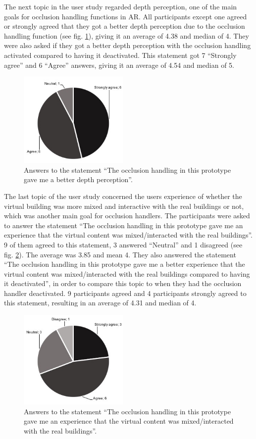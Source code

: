 The next topic in the user study regarded depth perception, one of the main goals for occlusion handling functions in AR. All participants except one agreed or strongly agreed that they got a better depth perception due to the occlusion handling function (see fig. \ref{fig:_image_user-depth}), giving it an average of 4.38 and median of 4. They were also asked if they got a better depth perception with the occlusion handling activated compared to having it deactivated. This statement got 7 ``Strongly agree'' and 6 ``Agree'' answers, giving it an average of 4.54 and median of 5.

\begin{figure}
\includegraphics[width=200px, height=174px]{_image_user-depth}
\caption{Answers to the statement ``The occlusion handling in this prototype gave me a better depth perception''.}
\label{fig:_image_user-depth}
\end{figure}

The last topic of the user study concerned the users experience of whether the virtual building was more mixed and interactive with the real buildings or not, which was another main goal for occlusion handlers. The participants were asked to answer the statement ``The occlusion handling in this prototype gave me an experience that the virtual content was mixed/interacted with the real buildings''. 9 of them agreed to this statement, 3 answered ``Neutral'' and 1 disagreed (see fig. \ref{fig:_image_user-mixed-interact}). The average was 3.85 and mean 4. They also answered the statement ``The occlusion handling in this prototype gave me a better experience that the virtual content was mixed/interacted with the real buildings compared to having it deactivated'', in order to compare this topic to when they had the occlusion handler deactivated. 9 participants agreed and 4 participants strongly agreed to this statement, resulting in an average of 4.31 and median of 4.

\begin{figure}
\includegraphics[width=200px, height=181px]{_image_user-mixed-interact}
\caption{Answers to the statement ``The occlusion handling in this prototype gave me an experience that the virtual content was mixed/interacted with the real buildings''.}
\label{fig:_image_user-mixed-interact}
\end{figure}

